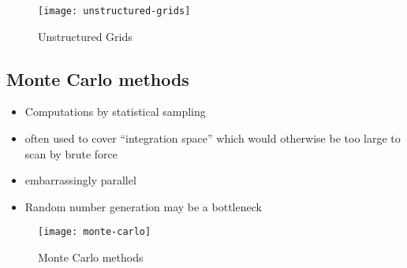 \begin{figure}[!htbp]
    \centering
    \texttt{[image: unstructured-grids]}
    \caption{Unstructured Grids}
\end{figure}

\subsection{Monte Carlo methods}
\begin{itemize}
    \item Computations by statistical sampling
    \item often used to cover “integration space” which would otherwise be too large to scan by brute force
    \item embarrassingly parallel
    \item Random number generation may be a bottleneck
\end{itemize}


\begin{figure}[!htbp]
    \centering
    \texttt{[image: monte-carlo]}
    \caption{Monte Carlo methods}
\end{figure}

